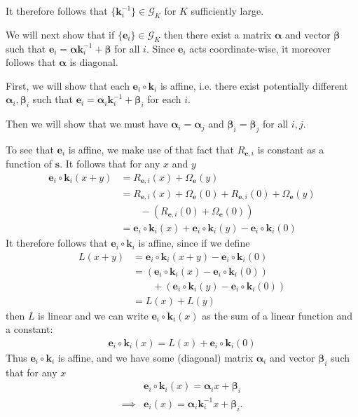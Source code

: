 \documentclass[letterpaper]{article}
\theoremstyle{definition}
\begin{document}
It therefore follows that $\{ \bm{k}^{-1}_i \}  \in \mathcal{G}_K$ for $K$ sufficiently large.


We will next show that if $\{ \bm{e}_i\} \in \mathcal{G}_K$ then there exist a matrix $\bm{\alpha}$ and vector $\bm{\beta}$ such that $\bm{e}_i = \bm{\alpha} \bm{k}_i^{-1} + \bm{\beta}$ for all $i$.
Since $\bm{e}_i$ acts coordinate-wise, it moreover follows that $\bm{\alpha}$ is diagonal.

First, we will show that each $\bm{e}_i\circ\bm{k}_i$ is affine, i.e. there exist potentially different $\bm{\alpha}_i, \bm{\beta}_i$ such that $\bm{e}_i = \bm{\alpha}_i \bm{k}_i^{-1} + \bm{\beta}_i$ for each $i$.

Then we will show that we must have $\bm{\alpha}_i = \bm{\alpha}_j$ and $\bm{\beta}_i = \bm{\beta}_j$ for all $i,j$.

To see that $\bm{e}_i$ is affine, we make use of that fact that $R_{\bm{e},i}$ is constant as a function of $\bm{s}$.
It follows that for any $x$ and $y$
\begin{align*}
    \bm{e}_i\circ\bm{k}_i(x + y) &= R_{\bm{e},i}(x) + \Omega_{\bm{e}}(y) \\
    &= R_{\bm{e},i}(x) + \Omega_{\bm{e}}(0) + R_{\bm{e},i}(0) + \Omega_{\bm{e}}(y) \\
    & \qquad- \left(R_{\bm{e},i}(0) +  \Omega_{\bm{e}}(0)\right) \\
    &= \bm{e}_i\circ\bm{k}_i(x) + \bm{e}_i\circ\bm{k}_i(y) - \bm{e}_i\circ\bm{k}_i(0)
\end{align*}
It therefore follows that $\bm{e}_i\circ\bm{k}_i$ is affine, since if we define
\begin{align*}
    L(x + y) &= \bm{e}_i\circ\bm{k}_i(x + y) - \bm{e}_i\circ\bm{k}_i(0) \\
    &= \left(\bm{e}_i\circ\bm{k}_i(x) - \bm{e}_i\circ\bm{k}_i(0)\right) \\
    & \qquad+ \left(\bm{e}_i\circ\bm{k}_i(y) - \bm{e}_i\circ\bm{k}_i(0)\right) \\
    &= L(x) + L(y)
\end{align*}
then $L$ is linear and we can write $\bm{e}_i\circ\bm{k}_i(x)$ as the sum of a linear function and a constant:
\begin{align*}
    \bm{e}_i\circ\bm{k}_i(x) = L(x) + \bm{e}_i\circ\bm{k}_i(0)
\end{align*}
Thus $\bm{e}_i\circ\bm{k}_i$ is affine, and we have some (diagonal) matrix $\bm{\alpha}_i$ and vector $\bm{\beta}_i$ such that for any $x$
\begin{align*}
    &\bm{e}_i\circ\bm{k}_i(x) = \bm{\alpha}_i x  + \bm{\beta}_i \\
    \implies& \bm{e}_i \left(x \right) = \bm{\alpha}_i \bm{k}_i^{-1} x + \bm{\beta}_i.
\end{align*}
\end{document}
